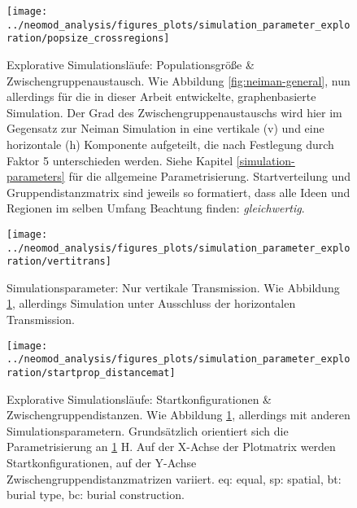 \documentclass[openany,twoside,twocolumn]{book}
\begin{document}
\begin{figure}[!t]

{\centering \texttt{[image: ../neomod\_analysis/figures\_plots/simulation\_parameter\_exploration/popsize\_crossregions]} 

}

\caption[Explorative Simulationsläufe: Populationsgröße \& Zwischengruppenaustausch]{Explorative Simulationsläufe: Populationsgröße \& Zwischengruppenaustausch. Wie Abbildung \ref{fig:neiman-general}, nun allerdings für die in dieser Arbeit entwickelte, graphenbasierte Simulation. Der Grad des Zwischengruppenaustauschs wird hier im Gegensatz zur Neiman Simulation in eine vertikale (v) und eine horizontale (h) Komponente aufgeteilt, die nach Festlegung durch Faktor 5 unterschieden werden. Siehe Kapitel \ref{simulation-parameters} für die allgemeine Parametrisierung. Startverteilung und Gruppendistanzmatrix sind jeweils so formatiert, dass alle Ideen und Regionen im selben Umfang Beachtung finden: \textit{gleichwertig}.}\label{fig:sim-popsize-crossregions}
\end{figure}

\begin{figure}[!t]

{\centering \texttt{[image: ../neomod\_analysis/figures\_plots/simulation\_parameter\_exploration/vertitrans]} 

}

\caption[Explorative Simulationsläufe: Nur vertikale Transmission]{Simulationsparameter: Nur vertikale Transmission. Wie Abbildung \ref{fig:sim-popsize-crossregions}, allerdings Simulation unter Ausschluss der horizontalen Transmission.}\label{fig:sim-vertitrans}
\end{figure}

\begin{figure}[!t]

{\centering \texttt{[image: ../neomod\_analysis/figures\_plots/simulation\_parameter\_exploration/startprop\_distancemat]} 

}

\caption[Explorative Simulationsläufe: Startkonfigurationen \& Zwischengruppendistanzen]{Explorative Simulationsläufe: Startkonfigurationen \& Zwischengruppendistanzen. Wie Abbildung \ref{fig:sim-popsize-crossregions}, allerdings mit anderen Simulationsparametern. Grundsätzlich orientiert sich die Parametrisierung an \ref{fig:sim-popsize-crossregions} H. Auf der X-Achse der Plotmatrix werden Startkonfigurationen, auf der Y-Achse Zwischengruppendistanzmatrizen variiert. eq: equal, sp: spatial, bt: burial type, bc: burial construction.}\label{fig:sim-startprop-distancemat}
\end{figure}
\end{document}
